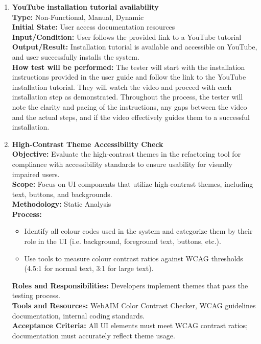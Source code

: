 \documentclass[12pt, titlepage]{article}
\begin{document}
\begin{enumerate}[label={\bf \textcolor{Maroon}{test-UH-\arabic*}}, wide=0pt, font=\itshape]
  \item \textbf{YouTube installation tutorial availability} \\[2mm]
    \textbf{Type:} Non-Functional, Manual, Dynamic \\ 
    \textbf{Initial State:} User access documentation resources \\
    \textbf{Input/Condition:} User follows the provided link to a YouTube tutorial \\
    \textbf{Output/Result:} Installation tutorial is available and accessible on YouTube, and user successfully installs the system. \\[2mm]
    \textbf{How test will be performed:} The tester will start with the installation instructions provided in the user guide and follow the link to the YouTube installation tutorial. They will watch the video and proceed with each installation step as demonstrated. Throughout the process, the tester will note the clarity and pacing of the instructions, any gaps between the video and the actual steps, and if the video effectively guides them to a successful installation. 

  \item \textbf{High-Contrast Theme Accessibility Check} \\[2mm]
    \textbf{Objective:} Evaluate the high-contrast themes in the refactoring tool for compliance with accessibility standards to ensure usability for visually impaired users. \\
    \textbf{Scope:} Focus on UI components that utilize high-contrast themes, including text, buttons, and backgrounds. \\
    \textbf{Methodology:} Static Analysis \\
    \textbf{Process:} 
    \begin{itemize}
      \item Identify all colour codes used in the system and categorize them by their role in the UI (i.e. background, foreground text, buttons, etc.).
      \item Use tools to measure colour contrast ratios against WCAG thresholds (4.5:1 for normal text, 3:1 for large text)\cite{WCAG}.
    \end{itemize}
    \textbf{Roles and Responsibilities:} Developers implement themes that pass the testing process. \\[2mm]
    \textbf{Tools and Resources:} WebAIM Color Contrast Checker, WCAG guidelines documentation, internal coding standards. \\[2mm]
    \textbf{Acceptance Criteria:} All UI elements must meet WCAG contrast ratios; documentation must accurately reflect theme usage.


\end{enumerate}
\end{document}
